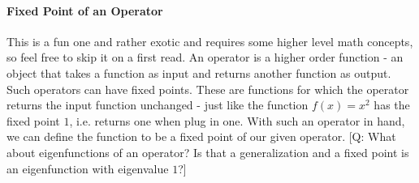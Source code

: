 


\paragraph{Fixed Point of an Operator}
This is a fun one and rather exotic and requires some higher level math concepts, so feel free to skip it on a first read. An operator is a higher order function - an object that takes a function as input and returns another function as output. Such operators can have fixed points. These are functions for which the operator returns the input function unchanged - just like the function $f(x) = x^2$ has the fixed point $1$, i.e. returns one when plug in one. With such an operator in hand, we can define the function to be a fixed point of our given operator. [Q: What about eigenfunctions of an operator? Is that a generalization and a fixed point is an eigenfunction with eigenvalue $1$?]



